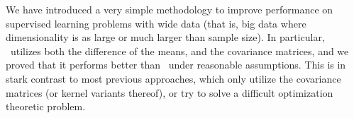 \documentclass[10pt]{article}
\begin{document}
%
%
%
%

We have introduced a very simple methodology to improve performance on supervised learning problems with  wide data (that is, big data where dimensionality is as large or much larger than sample size).  In particular, \Lol~utilizes both the difference of the means, and the covariance matrices, and we proved that it performs better than  \Pca~under reasonable assumptions.  This is in stark contrast to most previous approaches, which only utilize the covariance matrices (or kernel variants thereof), or try to solve a difficult optimization theoretic problem.  

\end{document}
